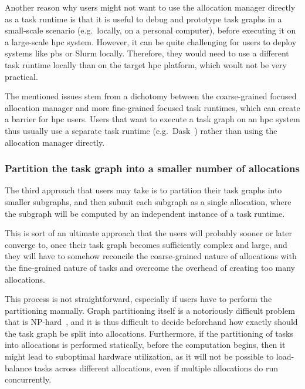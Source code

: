 Another reason why users might not want to use the allocation manager directly as a task runtime is
that it is useful to debug and prototype task graphs in a small-scale scenario (e.g.\ locally, on a
personal computer), before executing it on a large-scale \gls{hpc} system.
However, it can be quite challenging for users to deploy systems like \gls{pbs}
or Slurm locally. Therefore, they would need to use a different task runtime locally than on the
target \gls{hpc} platform, which woult not be very practical.

The mentioned issues stem from a dichotomy between the coarse-grained focused allocation manager
and more fine-grained focused task runtimes, which can create a barrier for
\gls{hpc} users. Users that want to execute a task graph on an
\gls{hpc} system thus usually use a separate task runtime (e.g.\
Dask~\cite{dask}) rather than using the allocation manager directly.

\subsubsection*{Partition the task graph into a smaller number of allocations}
The third approach that users may take is to partition their task graphs into smaller subgraphs,
and then submit each subgraph as a single allocation, where the subgraph will be computed by an
independent instance of a task runtime.

This is sort of an ultimate approach that the users will probably sooner or later converge to, once
their task graph becomes sufficiently complex and large, and they will have to somehow reconcile
the coarse-grained nature of allocations with the fine-grained nature of tasks and overcome the
overhead of creating too many allocations.

This process is not straightforward, especially if users have to perform the partitioning manually.
Graph partitioning itself is a notoriously difficult problem that is
NP-hard~\cite{graph_partitioning}\todo[inline]{Ada: Is this OK?}, and it is thus difficult to decide
beforehand how exactly should the task graph be split into allocations. Furthermore, if the
partitioning of tasks into allocations is performed statically, before the computation begins, then
it might lead to suboptimal hardware utilization, as it will not be possible to load-balance tasks
across different allocations, even if multiple allocations do run concurrently.

